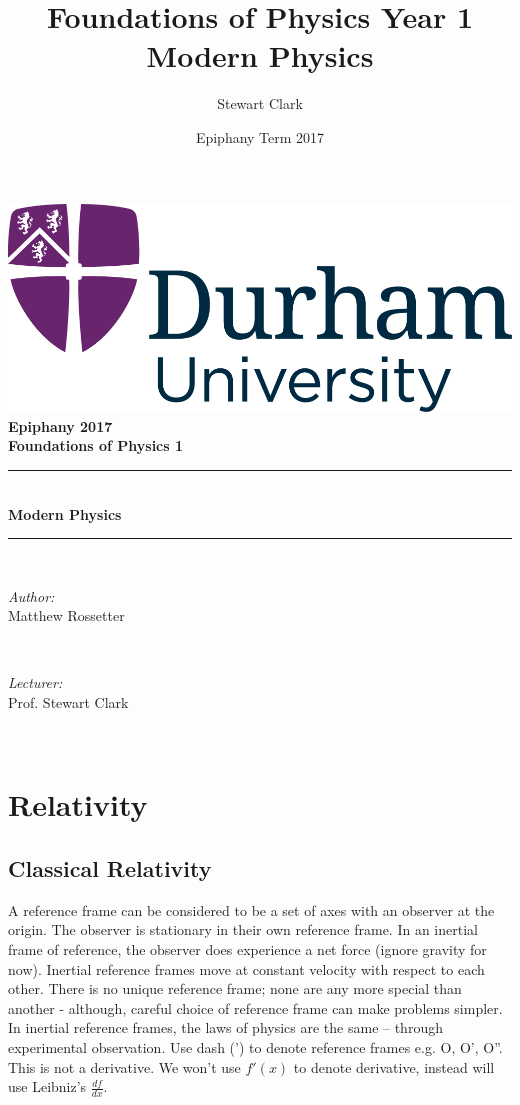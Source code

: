 \documentclass[a4paper, 11pt, normalem]{report}
\title{Foundations of Physics Year 1 \\ Modern Physics \vspace{-20pt}}
\author{Stewart Clark}
\date{\vspace{-15pt}Epiphany Term 2017}
\begin{document}
\begin{titlepage}
    \newcommand{\HRule}{\rule{\linewidth}{0.5mm}}
    \center
    {\includegraphics[scale=0.5]{../../logo0.png}\hfill{\Large\bfseries Epiphany 2017}}\\[2.5cm]
    {\LARGE\bfseries Foundations of Physics 1}\\[1.5cm]
    \HRule \\[0.7cm]
    {\huge\bfseries Modern Physics}\\[0.4cm]
    \HRule \\[1.5cm]

    \begin{minipage}{0.4\textwidth}
        \begin{flushleft} \large
            \emph{Author:} \\ Matthew Rossetter
        \end{flushleft}
    \end{minipage}~
    \begin{minipage}{0.4\textwidth}
        \begin{flushright} \large
            \emph{Lecturer:} \\ Prof. Stewart Clark
        \end{flushright}
    \end{minipage}\\[2cm]
    \vfill
\end{titlepage}

\chapter{Relativity}
\section{Classical Relativity}
A reference frame can be considered to be a set of axes with an observer at the origin.
The observer is stationary in their own reference frame.
In an inertial frame of reference, the observer does experience a net force (ignore gravity for now).
Inertial reference frames move at constant velocity with respect to each other.
There is no unique reference frame; none are any more special than another - although, careful choice of reference frame can make problems simpler.
In inertial reference frames, the laws of physics are the same -- through experimental observation.
Use dash (') to denote reference frames e.g. O, O', O''.
This is not a derivative.
We won't use $f'(x)$ to denote derivative, instead will use Leibniz's $\frac{df}{dx}$.
\end{document}

